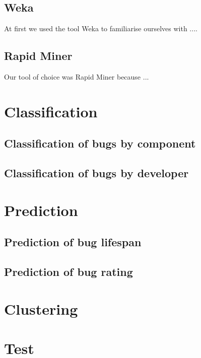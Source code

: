 \subsection{Weka} %
\label{sub:Weka}

At first we used the tool Weka to familiarise ourselves with ....


\subsection{Rapid Miner} %
\label{sub:Rapid Miner}

Our tool of choice was Rapid Miner because ...



\section{Classification} %
\label{sub:Classification}

\subsection{Classification of bugs by component} %
\label{sub:Classification of bugs bugs by component}

\subsection{Classification of bugs by developer} %
\label{sub:Classification of bugs bugs by developer}


\section{Prediction} %
\label{sub:Prediction}

\subsection{Prediction of bug lifespan} %
\label{sub:Prediction of bug lifespan}

\subsection{Prediction of bug rating} %
\label{sub:Prediction of bug rating}


\section{Clustering} %
\label{sub:Clustering}

\section{Test} %
\label{sec:Test}

